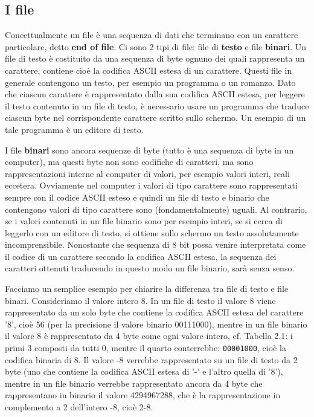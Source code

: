 \documentclass[a4paper,12pt]{book}
\begin{document}
\subsection{I file}
Concettualmente un file è una sequenza di dati che terminano con un carattere particolare, detto \textbf{end of file}.
Ci sono 2 tipi di file: file di \textbf{testo} e file \textbf{binari}.
Un file di testo è costituito da una sequenza di byte ognuno dei quali rappresenta un carattere, contiene cioè la codifica ASCII estesa di un carattere.
Questi file in generale contengono un testo, per esempio un programma o un romanzo.
Dato che ciascun carattere è rappresentato dalla sua codifica ASCII estesa, per leggere il testo contenuto in un file di testo, è necessario usare un programma che traduce ciascun byte nel corrispondente carattere scritto sullo schermo.
Un esempio di un tale programma è un editore di testo. 

I file \textbf{binari} sono ancora sequenze di byte (tutto è una sequenza di byte in un computer), ma questi byte non sono codifiche di caratteri, ma sono rappresentazioni interne al computer di valori, per esempio valori interi, reali eccetera.
Ovviamente nel computer i valori di tipo carattere sono rappresentati sempre con il codice ASCII esteso e quindi un file di testo e binario che contengono valori di tipo carattere sono (fondamentalmente) uguali.
Al contrario, se i valori contenuti in un file binario sono per esempio interi, se si cerca di leggerlo con un editore di testo, si ottiene sullo schermo un testo assolutamente incomprensibile.
Nonostante che sequenza di 8 bit possa venire interpretata come il codice di un carattere secondo la codifica ASCII estesa, la sequenza dei caratteri ottenuti traducendo in questo modo un file binario, sarà senza senso. 

Facciamo un semplice esempio per chiarire la differenza tra file di testo e file binari.
Consideriamo il valore intero 8.
In un file di testo il valore 8 viene rappresentato da un solo byte che contiene la codifica ASCII estesa del carattere '8', cioè 56 (per la precisione il valore binario 00111000), mentre in un file binario il valore 8 è rappresentato da 4 byte come ogni valore intero, cf. Tabella 2.1: i primi 3 composti da tutti 0, mentre il quarto conterrebbe: \texttt{00001000}, cioè la codifica binaria di 8.
Il valore -8 verrebbe rappresentato su un file di testo da 2 byte (uno che contiene la codifica ASCII estesa di '-' e l'altro quella di '8'), mentre in un file binario verrebbe rappresentato ancora da 4 byte che rappresentano in binario il valore 4294967288, che è la rappresentazione in complemento a 2 dell'intero -8, cioè 2-8.
\end{document}
